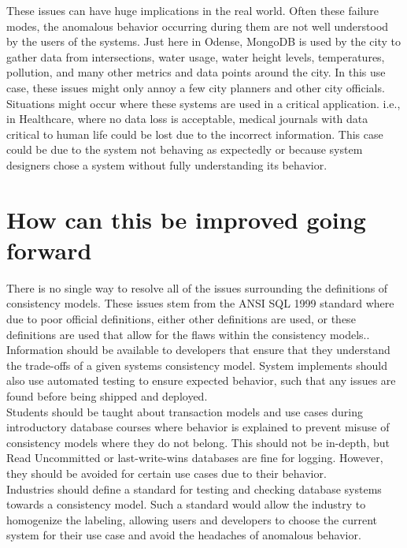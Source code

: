 \documentclass[a4paper,10pt,titlepage]{report}
\begin{document}
These issues can have huge implications in the real world. Often these failure modes, the anomalous behavior occurring during them are not well understood by the users of the systems. Just here in Odense, MongoDB is used by the city to gather data from intersections, water usage, water height levels, temperatures, pollution, and many other metrics and data points around the city. In this use case, these issues might only annoy a few city planners and other city officials. Situations might occur where these systems are used in a critical application. i.e., in Healthcare, where no data loss is acceptable, medical journals with data critical to human life could be lost due to the incorrect information. This case could be due to the system not behaving as expectedly or because system designers chose a system without fully understanding its behavior.

\section{How can this be improved going forward}

There is no single way to resolve all of the issues surrounding the definitions of consistency models. These issues stem from the ANSI SQL 1999\cite{ansisql1999} standard where due to poor official definitions, either other definitions are used, or these definitions are used that allow for the flaws within the consistency models.. Information should be available to developers that ensure that they understand the trade-offs of a given systems consistency model. System implements should also use automated testing to ensure expected behavior, such that any issues are found before being shipped and deployed. \\
\vspace{5mm}
Students should be taught about transaction models and use cases during introductory database courses where behavior is explained to prevent misuse of consistency models where they do not belong. This should not be in-depth, but Read Uncommitted or last-write-wins databases are fine for logging. However, they should be avoided for certain use cases due to their behavior.\\
\vspace{5mm}
Industries should define a standard for testing and checking database systems towards a consistency model. Such a standard would allow the industry to homogenize the labeling, allowing users and developers to choose the current system for their use case and avoid the headaches of anomalous behavior.
\end{document}
